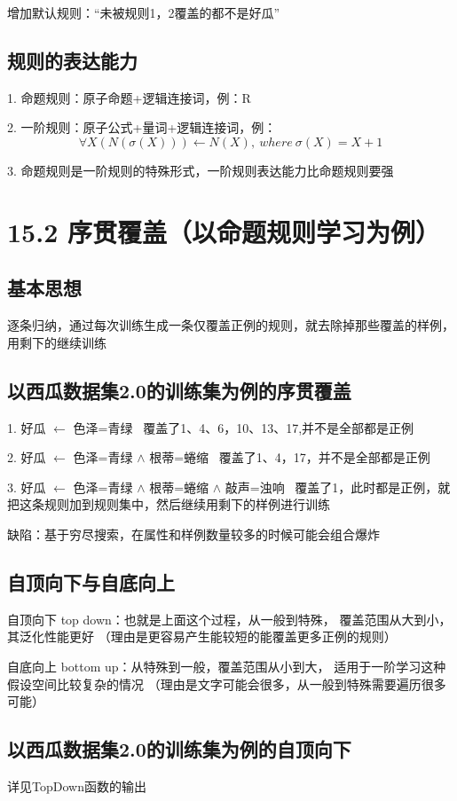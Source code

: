 \documentclass[UTF8]{article}
\begin{document}
    增加默认规则：“未被规则1，2覆盖的都不是好瓜”

\subsection{规则的表达能力}
    1. 命题规则：原子命题+逻辑连接词，例：R

    2. 一阶规则：原子公式+量词+逻辑连接词，例：
    \begin{equation}
        \forall X(N(\sigma (X)))\leftarrow N(X), ~where~ \sigma (X)=X+1
    \end{equation}
    
    3. 命题规则是一阶规则的特殊形式，一阶规则表达能力比命题规则要强

\section{15.2 序贯覆盖（以命题规则学习为例）}
\subsection{基本思想}
    逐条归纳，通过每次训练生成一条仅覆盖正例的规则，就去除掉那些覆盖的样例，用剩下的继续训练
\subsection{以西瓜数据集2.0的训练集为例的序贯覆盖}  
    1. 好瓜 $\leftarrow$ 色泽=青绿 
    ~覆盖了1、4、6，10、13、17,并不是全部都是正例  
    
    2. 好瓜 $\leftarrow$ 色泽=青绿 $\wedge$ 根蒂=蜷缩 
    ~覆盖了1、4，17，并不是全部都是正例  
    
    3. 好瓜 $\leftarrow$ 色泽=青绿 $\wedge$ 根蒂=蜷缩 $\wedge$ 敲声=浊响 
    ~覆盖了1，此时都是正例，就把这条规则加到规则集中，然后继续用剩下的样例进行训练
    
    缺陷：基于穷尽搜索，在属性和样例数量较多的时候可能会组合爆炸
\subsection{自顶向下与自底向上}
    自顶向下 top down：也就是上面这个过程，从一般到特殊，
    覆盖范围从大到小，其泛化性能更好
    （理由是更容易产生能较短的能覆盖更多正例的规则）
    
    自底向上 bottom up：从特殊到一般，覆盖范围从小到大，
    适用于一阶学习这种假设空间比较复杂的情况
    （理由是文字可能会很多，从一般到特殊需要遍历很多可能）
\subsection{以西瓜数据集2.0的训练集为例的自顶向下}
    详见TopDown函数的输出
\end{document}
